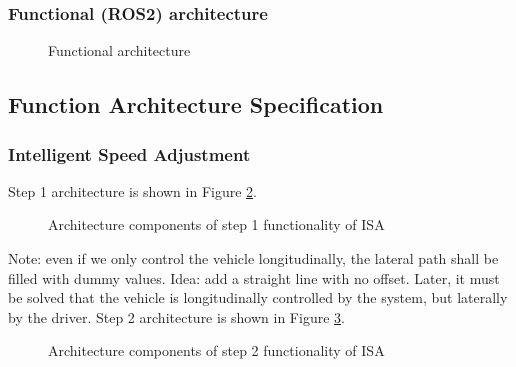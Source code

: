 \documentclass[sn-mathphys-num]{sn-jnl}%
\begin{document}
\subsubsection{Functional (ROS2) architecture}
\begin{figure}[h]
    \caption{Functional architecture}
    \label{fig:fun_arch}
\end{figure}

\subsection{Function Architecture Specification}
\subsubsection{Intelligent Speed Adjustment}
Step 1 architecture is shown in Figure \ref{fig:sa_step1}.
\begin{figure}[h]
    \caption{Architecture components of step 1 functionality of ISA}
    \label{fig:sa_step1}
\end{figure}
Note: even if we only control the vehicle longitudinally, the lateral path shall be filled with dummy values. Idea: add a straight line with no offset. Later, it must be solved that the vehicle is longitudinally controlled by the system, but laterally by the driver.
\newline Step 2 architecture is shown in Figure \ref{fig:sa_step2}.
\begin{figure}[h]
    \caption{Architecture components of step 2 functionality of ISA}
    \label{fig:sa_step2}
\end{figure}
\end{document}
